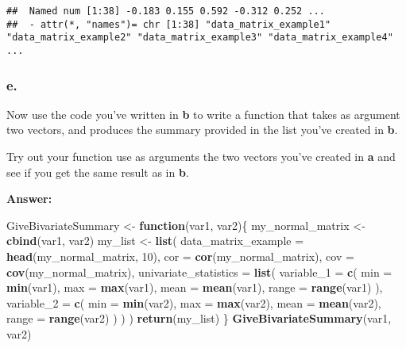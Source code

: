 \documentclass[]{article}
\newenvironment{Shaded}{\begin{snugshade}}{\end{snugshade}}
\newcommand{\ControlFlowTok}[1]{\textcolor[rgb]{0.13,0.29,0.53}{\textbf{#1}}}
\newcommand{\DataTypeTok}[1]{\textcolor[rgb]{0.13,0.29,0.53}{#1}}
\newcommand{\DecValTok}[1]{\textcolor[rgb]{0.00,0.00,0.81}{#1}}
\newcommand{\KeywordTok}[1]{\textcolor[rgb]{0.13,0.29,0.53}{\textbf{#1}}}
\newcommand{\NormalTok}[1]{#1}
\newcommand{\StringTok}[1]{\textcolor[rgb]{0.31,0.60,0.02}{#1}}
\begin{document}
\begin{verbatim}
##  Named num [1:38] -0.183 0.155 0.592 -0.312 0.252 ...
##  - attr(*, "names")= chr [1:38] "data_matrix_example1" "data_matrix_example2" "data_matrix_example3" "data_matrix_example4" ...
\end{verbatim}

\hypertarget{e.-1}{%
\subsubsection{e.}\label{e.-1}}

Now use the code you've written in \textbf{b} to write a function that
takes as argument two vectors, and produces the summary provided in the
list you've created in \textbf{b}.

Try out your function use as arguments the two vectors you've created in
\textbf{a} and see if you get the same result as in \textbf{b}.

\textbf{Answer:}

\begin{Shaded}
\begin{Highlighting}[]
\NormalTok{GiveBivariateSummary <-}\StringTok{ }\ControlFlowTok{function}\NormalTok{(var1, var2)\{}
\NormalTok{  my_normal_matrix <-}\StringTok{ }\KeywordTok{cbind}\NormalTok{(var1, var2)}
\NormalTok{  my_list <-}\StringTok{ }\KeywordTok{list}\NormalTok{(}
    \DataTypeTok{data_matrix_example =} \KeywordTok{head}\NormalTok{(my_normal_matrix, }\DecValTok{10}\NormalTok{),}
    \DataTypeTok{cor =} \KeywordTok{cor}\NormalTok{(my_normal_matrix),}
    \DataTypeTok{cov =} \KeywordTok{cov}\NormalTok{(my_normal_matrix),}
    \DataTypeTok{univariate_statistics =} \KeywordTok{list}\NormalTok{(}
      \DataTypeTok{variable_1 =} \KeywordTok{c}\NormalTok{(}
        \DataTypeTok{min =} \KeywordTok{min}\NormalTok{(var1), }
        \DataTypeTok{max =} \KeywordTok{max}\NormalTok{(var1), }
        \DataTypeTok{mean =} \KeywordTok{mean}\NormalTok{(var1), }
        \DataTypeTok{range =} \KeywordTok{range}\NormalTok{(var1)}
\NormalTok{      ), }
      \DataTypeTok{variable_2 =} \KeywordTok{c}\NormalTok{(}
        \DataTypeTok{min =} \KeywordTok{min}\NormalTok{(var2),}
        \DataTypeTok{max =} \KeywordTok{max}\NormalTok{(var2), }
        \DataTypeTok{mean =} \KeywordTok{mean}\NormalTok{(var2),}
        \DataTypeTok{range =} \KeywordTok{range}\NormalTok{(var2)}
\NormalTok{      )}
\NormalTok{    )}
\NormalTok{  )}
  \KeywordTok{return}\NormalTok{(my_list)}
\NormalTok{\}}
\KeywordTok{GiveBivariateSummary}\NormalTok{(var1, var2)}
\end{Highlighting}
\end{Shaded}
\end{document}

